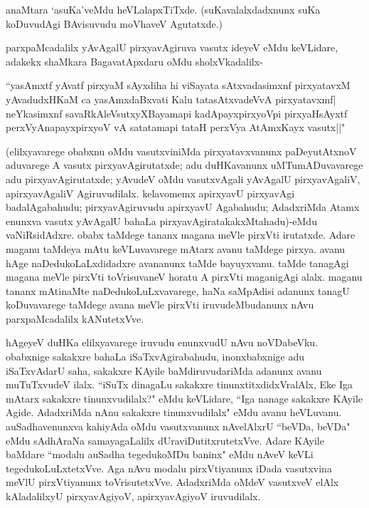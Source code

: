 anaMtara `asuKa'veMdu heVLalapxTiTxde. (suKavalalxdadxnunx suKa koDuvudAgi BAvisuvudu moVhaveV Agutatxde.)

parxpaMcadalilx yAvAgalU pirxyavAgiruva vasutx ideyeV eMdu keVLidare, adakekx shaMkara BagavatApxdaru oMdu sholxVkadalilx-

\begin{shloka}
``yasAmxtf yAvatf pirxyaM sAyxdiha hi viSayata sAtxvadasimxnf pirxyatavxM\\
yAvadudxHKaM ca yasAmxdaBxvati Kalu tatasAtxvadeVvA pirxyatavxmf|\\
neYkasimxnf savaRkAleV\s sutxyXBayamapi kadApayxpirxyoV\s pi pirxyaHsAyxtf\\
perxVyAnapayxpirxyoV vA satatamapi tataH perxVya AtAmxKayx vasutx||"
\end{shloka}

(elilxyavarege obabxnu oMdu vasutxviniMda pirxyatavxvanunx paDeyutAtxnoV aduvarege A vasutx pirxyavAgirutatxde; adu duHKavanunx uMTumADuvavarege adu pirxyavAgirutatxde; yAvudeV oMdu vasutxvAgali yAvAgalU pirxyavAgaliV, apirxyavAgaliV Agiruvudilalx. kelavomemx apirxyavU pirxyavAgi badalAgabahudu; pirxyavAgiruvudu apirxyavU Agabahudu; AdadxriMda Atamx enunxva vasutx yAvAgalU bahaLa pirxyavAgiratakakxMtahadu)-eMdu vaNiRsidAdxre. obabx taMdege tananx magana meVle pirxVti irutatxde. Adare maganu taMdeya mAtu keVLuvavarege mAtarx avanu taMdege pirxya. avanu hAge naDedukoLaLxdidadxre avananunx taMde bayuyxvanu. taMde tanagAgi magana meVle pirxVti toVrisuvaneV horatu A pirxVti maganigAgi alalx. maganu tananx mAtinaMte naDedukoLuLxvavarege, haNa saMpAdisi adanunx tanagU koDuvavarege taMdege avana meVle pirxVti iruvudeMbudanunx nAvu parxpaMcadalilx kANutetxVve.

hAgeyeV duHKa elilxyavarege iruvudu enunxvudU nAvu noVDabeVku. obabxnige sakakxre bahaLa iSaTxvAgirabahudu, inonxbabxnige adu iSaTxvAdarU saha, sakakxre KAyile baMdiruvudariMda adanunx avanu muTuTxvudeV ilalx. ``iSuTx dinagaLu sakakxre tinunxtitxdidxVralAlx, Eke Iga mAtarx sakakxre tinunxvudilalx?" eMdu keVLidare, ``Iga nanage sakakxre KAyile Agide. AdadxriMda nAnu sakakxre tinunxvudilalx" eMdu avanu heVLuvanu. auSadhavenunxva kahiyAda oMdu vasutxvanunx nAvelAlxrU ``beVDa, beVDa" eMdu sAdhAraNa samayagaLalilx dUraviDutitxrutetxVve. Adare KAyile baMdare ``modalu auSadha tegedukoMDu baninx" eMdu nAveV keVLi tegedukoLuLxtetxVve. Aga nAvu modalu pirxVtiyanunx iDada vasutxvina meVlU pirxVtiyanunx toVrisutetxVve. AdadxriMda oMdeV vasutxveV elAlx kAladalilxyU pirxyavAgiyoV, apirxyavAgiyoV iruvudilalx.

